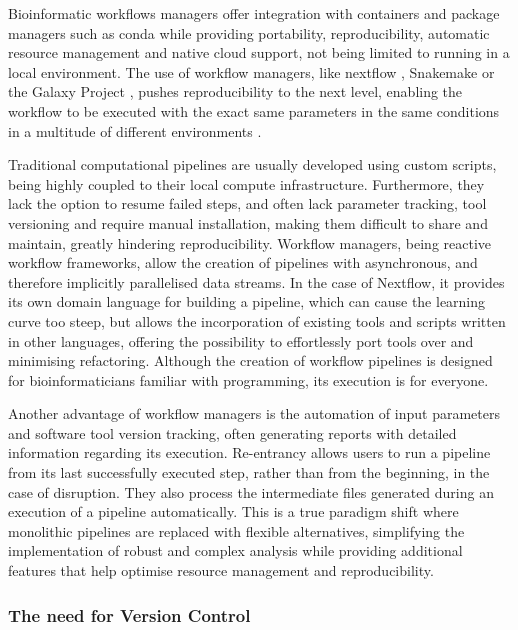 Bioinformatic workflows managers offer integration with containers and package managers such as conda while providing portability, reproducibility, automatic resource management and native cloud support, not being limited to running in a local environment. 
The use of workflow managers, like nextflow \citep{di_tommaso_nextflow_2017}, Snakemake or the Galaxy Project \citep{afgan_galaxy_2018}, pushes reproducibility to the next level, enabling the workflow to be executed with the exact same parameters in the same conditions in a multitude of different environments \citep{wratten_reproducible_2021}. 

Traditional computational pipelines are usually developed using custom scripts, being highly coupled to their local compute infrastructure. Furthermore, they lack the option to resume failed steps, and often lack parameter tracking, tool versioning and require manual installation, making them difficult to share and maintain, greatly hindering reproducibility. Workflow managers, being reactive workflow frameworks, allow the creation of pipelines with asynchronous, and therefore implicitly parallelised data streams. In the case of Nextflow, it provides its own domain language for building a pipeline, which can cause the learning curve too steep, but allows the incorporation of existing tools and scripts written in other languages, offering the possibility to effortlessly port tools over and minimising refactoring. Although the creation of workflow pipelines is designed for bioinformaticians familiar with programming, its execution is for everyone. 

Another advantage of workflow managers is the automation of input parameters and software tool version tracking, often generating reports with detailed information regarding its execution. Re-entrancy allows users to run a pipeline from its last successfully executed step, rather than from the beginning, in the case of disruption. They also process the intermediate files generated during an execution of a pipeline automatically. This is a true paradigm shift where monolithic pipelines are replaced with flexible alternatives, simplifying the implementation of robust and complex analysis while providing additional features that help optimise resource management and reproducibility.  

\subsubsection{The need for Version Control}

